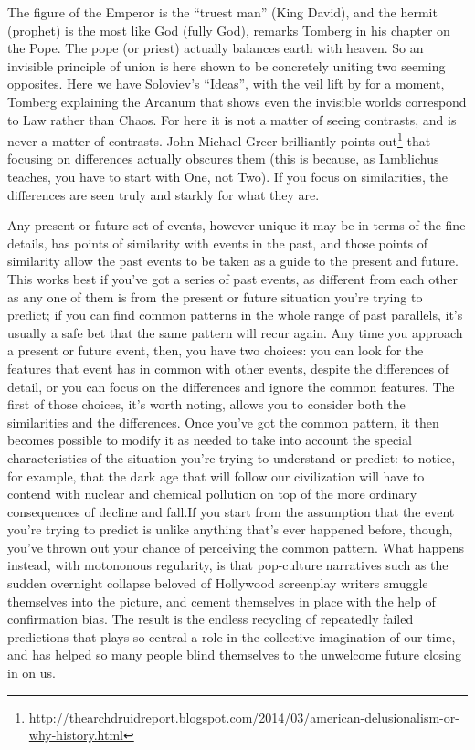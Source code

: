 The figure of the Emperor is the ``truest man'' (King David), and the hermit (prophet) is the most like God (fully God), remarks Tomberg in his chapter on the Pope. The pope (or priest) actually balances earth with heaven. So an invisible principle of union is here shown to be concretely uniting two seeming opposites. Here we have Soloviev's ``Ideas'', with the veil lift by for a moment, Tomberg explaining the Arcanum that shows even the invisible worlds correspond to Law rather than Chaos. For here it is not a matter of seeing contrasts, and is never a matter of contrasts. John Michael Greer brilliantly points out\footnote{\url{http://thearchdruidreport.blogspot.com/2014/03/american-delusionalism-or-why-history.html}} that focusing on differences actually obscures them (this is because, as Iamblichus teaches, you have to start with One, not Two). If you focus on similarities, the differences are seen truly and starkly for what they are.

\begin{quotex}
Any present or future set of events, however unique it may be in terms of the fine details, has points of similarity with events in the past, and those points of similarity allow the past events to be taken as a guide to the present and future. This works best if you've got a series of past events, as different from each other as any one of them is from the present or future situation you're trying to predict; if you can find common patterns in the whole range of past parallels, it's usually a safe bet that the same pattern will recur again. Any time you approach a present or future event, then, you have two choices: you can look for the features that event has in common with other events, despite the differences of detail, or you can focus on the differences and ignore the common features. The first of those choices, it's worth noting, allows you to consider both the similarities and the differences. Once you've got the common pattern, it then becomes possible to modify it as needed to take into account the special characteristics of the situation you're trying to understand or predict: to notice, for example, that the dark age that will follow our civilization will have to contend with nuclear and chemical pollution on top of the more ordinary consequences of decline and fall.If you start from the assumption that the event you're trying to predict is unlike anything that's ever happened before, though, you've thrown out your chance of perceiving the common pattern. What happens instead, with motononous regularity, is that pop-culture narratives such as the sudden overnight collapse beloved of Hollywood screenplay writers smuggle themselves into the picture, and cement themselves in place with the help of confirmation bias. The result is the endless recycling of repeatedly failed predictions that plays so central a role in the collective imagination of our time, and has helped so many people blind themselves to the unwelcome future closing in on us.
\end{quotex}


